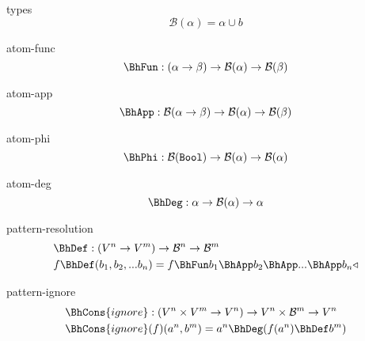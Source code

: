 \documentclass[preview]{standalone}
\begin{document}
\begin{docimage}{types}
  \begin{equation*}%
    \mathcal{B}(\alpha) = \alpha \cup b  
  \end{equation*}
\end{docimage} 


\begin{docimage}{atom-func}
  \begin{equation*}%
    \BhFun : (\alpha \rightarrow \beta) \rightarrow \mathcal{B}(\alpha) \rightarrow \mathcal{B}(\beta)  
  \end{equation*}
\end{docimage} 

\begin{docimage}{atom-app}
  \begin{equation*}%
    \BhApp :  \mathcal{B}(\alpha \rightarrow \beta) \rightarrow \mathcal{B}(\alpha) \rightarrow \mathcal{B}(\beta)  
  \end{equation*}
\end{docimage}

\begin{docimage}{atom-phi}
  \begin{equation*}%
    \BhPhi :  \mathcal{B}(\mathtt{Bool}) \rightarrow \mathcal{B}(\alpha) \rightarrow \mathcal{B}(\alpha)  
  \end{equation*}
\end{docimage}

\begin{docimage}{atom-deg}
  \begin{equation*}%
    \BhDeg :  \alpha \rightarrow \mathcal{B}(\alpha) \rightarrow \alpha  
  \end{equation*}
\end{docimage}

\begin{docimage}{pattern-resolution}%
  \begin{align*}%
    &\BhDef :
      (V^n \rightarrow V^m)
      \rightarrow \mathcal{B}^n \rightarrow \mathcal{B}^m \\
    &f \BhDef (b_1,b_2,...b_n) =
      f \BhFun b_1 \BhApp b_2 \BhApp ... \BhApp b_n \triangleleft
  \end{align*}
\end{docimage}

\begin{docimage}{pattern-ignore}
  \begin{align*}%
    &\BhCons{ignore} :
      (V^n \times V^m \rightarrow V^n)
      \rightarrow V^n \times \mathcal{B}^m \rightarrow V^n \\
    &\BhCons{ignore} (f) (a^n,b^m) =
      a^n \BhDeg (f(a^n) \BhDef b^m)
  \end{align*}
\end{docimage}
\end{document}
